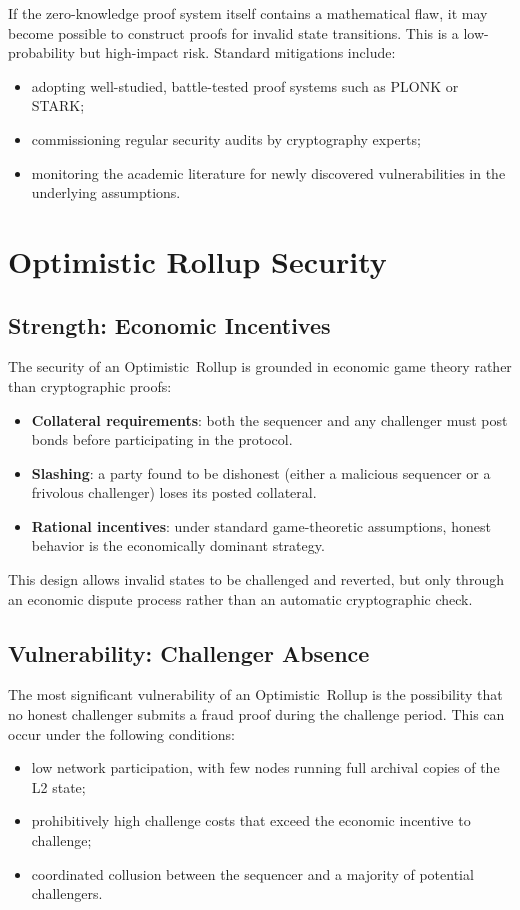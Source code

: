 If the zero-knowledge proof system itself contains a mathematical flaw, it may become possible to construct proofs for invalid state transitions. This is a low-probability but high-impact risk. Standard mitigations include:
\begin{itemize}
    \item adopting well-studied, battle-tested proof systems such as PLONK or STARK;
    \item commissioning regular security audits by cryptography experts;
    \item monitoring the academic literature for newly discovered vulnerabilities in the underlying assumptions.
\end{itemize}

\section{Optimistic Rollup Security}

\subsection{Strength: Economic Incentives}

The security of an Optimistic~Rollup is grounded in economic game theory rather than cryptographic proofs:
\begin{itemize}
    \item \textbf{Collateral requirements}: both the sequencer and any challenger must post bonds before participating in the protocol.
    \item \textbf{Slashing}: a party found to be dishonest (either a malicious sequencer or a frivolous challenger) loses its posted collateral.
    \item \textbf{Rational incentives}: under standard game-theoretic assumptions, honest behavior is the economically dominant strategy.
\end{itemize}

This design allows invalid states to be challenged and reverted, but only through an economic dispute process rather than an automatic cryptographic check.

\subsection{Vulnerability: Challenger Absence}

The most significant vulnerability of an Optimistic~Rollup is the possibility that no honest challenger submits a fraud proof during the challenge period. This can occur under the following conditions:
\begin{itemize}
    \item low network participation, with few nodes running full archival copies of the L2 state;
    \item prohibitively high challenge costs that exceed the economic incentive to challenge;
    \item coordinated collusion between the sequencer and a majority of potential challengers.
\end{itemize}

